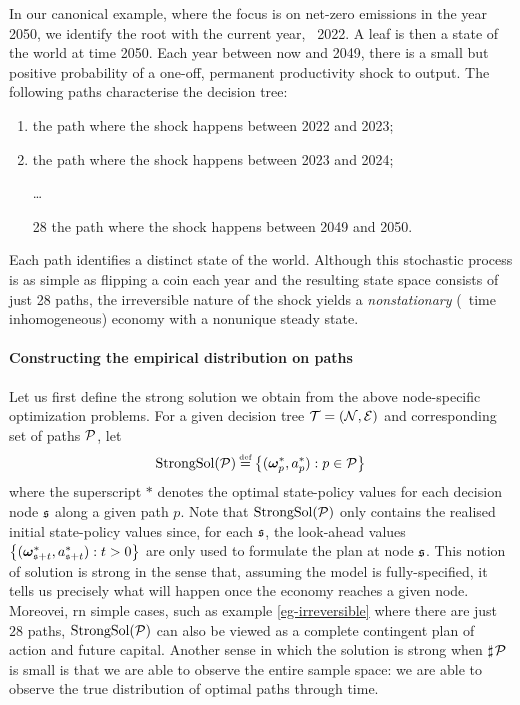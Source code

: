 \documentclass[12pt,a4paper,twoside, draft]{article}
\begin{document}
\begin{example}\label{eg-irreversible}
   In our canonical example, where the focus is on net-zero emissions in the
   year 2050, we identify the root with the current year, \eg~2022.
   A leaf is then a state of the world at time 2050.
   Each year between now and 2049, there is a small but positive probability of
   a one-off, permanent productivity shock to output.
   The following paths characterise the decision tree:
   \begin{enumerate}[1]
      \item the path where the shock happens between 2022 and 2023;
      \item the path where the shock happens between 2023 and 2024;
      \item[] \dots
      \item[28] the path where the shock happens between 2049 and 2050.
   \end{enumerate}
   Each path identifies a distinct state of the world.
   Although this stochastic process is as simple as flipping a coin
   each year and the resulting state space consists of just 28 paths,
   the irreversible nature of the shock yields a
   \emph{nonstationary} (\ie~time inhomogeneous) economy with a nonunique
   steady state.
\end{example}
\paragraph{Constructing the empirical distribution on paths}
Let us first define the strong solution we obtain from the above node-specific
optimization problems.
For a given decision tree $\mathcal T = (\mathcal N, \mathcal E)$ and corresponding set of
paths $\mathcal P$, let
\[
   \textup{StrongSol}(\mc P) \defeq \left\{
      (\boldsymbol{\omega}^{*}_{p}, a^{*}_{p}) : p \in \mc P
   \right\}
\]
where the superscript $*$ denotes the optimal state-policy values
for each decision node $\mathfrak{s}$ along a given path $p$.
Note that $\textup{StrongSol}(\mathcal P)$ only contains the realised initial
state-policy values since, for each $\mathfrak{s}$, the look-ahead values
$\left\{(\boldsymbol{\omega}^{*}_{\mathfrak{s} + t}, a^{*}_{\mathfrak{s} + t}) : t > 0 \right\}$ are only used to
formulate the plan at node $\mathfrak{s}$.
This notion of solution is strong in the sense that, assuming the model is
fully-specified, it tells us precisely what will happen once the economy
reaches a given node.
Moreovei, rn simple cases, such as example \ref{eg-irreversible} where there
are just $28$ paths, $\textup{StrongSol}(\mathcal P)$ can also be viewed as a
complete contingent plan of action and future capital.
Another sense in which the solution is strong when $\mathbin{\sharp}\hskip1pt \mathcal P$
is small is that we are able to observe the entire sample space: we are able to
observe the true distribution of optimal paths through time.
\end{document}
